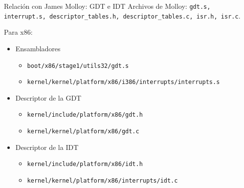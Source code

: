 \begin{frame}{Relación con James Molloy: GDT e IDT}
	Archivos de Molloy: \texttt{gdt.s, interrupt.s, descriptor\_tables.h, descriptor\_tables.c, isr.h, isr.c}.
	
	Para x86:
	\begin{itemize} \setlength\itemsep{0pt} \footnotesize
		\item Ensambladores
		\begin{itemize} \setlength\itemsep{0pt}
			\item \texttt{boot/x86/stage1/utils32/gdt.s}
			\item \texttt{kernel/kernel/platform/x86/i386/interrupts/interrupts.s}
		\end{itemize}	
		
		\item Descriptor de la GDT
		\begin{itemize} \setlength\itemsep{0pt}
			\item \texttt{kernel/include/platform/x86/gdt.h}
			\item \texttt{kernel/kernel/platform/x86/gdt.c}
		\end{itemize}	
		
		\item Descriptor de la IDT
		\begin{itemize} \setlength\itemsep{0pt}
			\item \texttt{kernel/include/platform/x86/idt.h}
			\item \texttt{kernel/kernel/platform/x86/interrupts/idt.c}
		\end{itemize}
		
	\end{itemize}
\end{frame}


